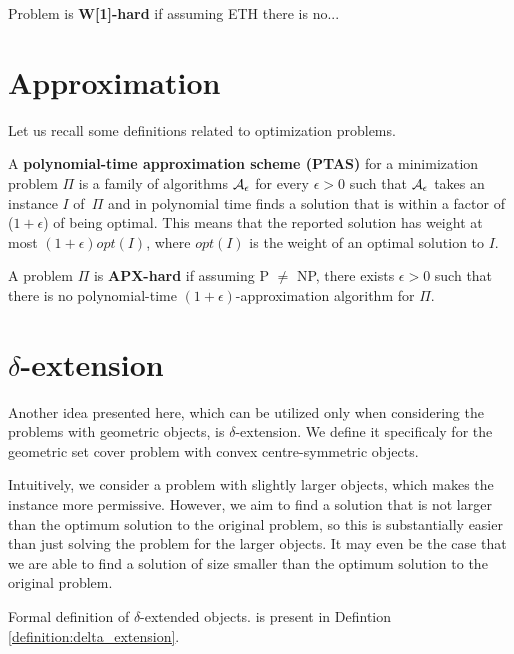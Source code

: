 \begin{tw}
Problem is \textbf{W[1]-hard} if assuming ETH there is no...
\end{tw}

\section{Approximation}

Let us recall some definitions related to optimization problems.

\begin{defi}
A \textbf{polynomial-time approximation scheme (PTAS)}
for a minimization problem $\Pi$
is a family of algorithms $\cal{A}_\epsilon$ for
every $\epsilon > 0$
such that $\cal{A}_\epsilon$ takes an instance $I$ of~$\Pi$
and in polynomial time
finds a solution that is within a factor
of ($1+\epsilon$) of being optimal.
This means that the reported solution has weight at most
$(1+\epsilon)opt(I)$, where $opt(I)$ is the weight
of an optimal solution to $I$.
\end{defi}

\begin{defi}
A problem $\Pi$ is \textbf{APX-hard} if assuming P $\neq$ NP,
there exists $\epsilon > 0$
such that there is no polynomial-time $(1+\epsilon)$-approximation algorithm
for $\Pi$.
\end{defi}

\section{$\delta$-extension}
\label{section:def:delta_extension}

Another idea presented here, which can be utilized only when considering
the problems with geometric objects,
is $\delta$-extension.
We define it specificaly for the geometric set cover problem
with convex centre-symmetric objects.

Intuitively, we consider a problem with slightly larger objects,
which makes the instance more permissive.
However, we aim to find a solution that
is not larger than the
optimum solution to the original problem,
so this is substantially easier than just
solving the problem for the larger objects.
It may even be the case
that we are able to find a solution
of size smaller than the optimum solution
to the original problem.

Formal definition of $\delta$-extended objects.
is present in Defintion
\ref{definition:delta_extension}.

